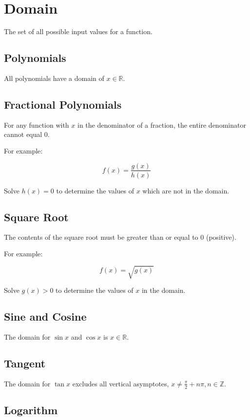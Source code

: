 \documentclass[a4paper,11pt]{article}
\begin{document}
\section{Domain}

The set of all possible input values for a function.


\subsection{Polynomials}

All polynomials have a domain of $x \in \mathbb{R}$.


\subsection{Fractional Polynomials}

For any function with $x$ in the denominator of a fraction, the entire
denominator cannot equal 0.

For example:

$$
f(x) = \frac{g(x)}{h(x)}
$$

Solve $h(x) = 0$ to determine the values of $x$ which are not in the domain.


\subsection{Square Root}

The contents of the square root must be greater than or equal to 0 (positive).

For example:

$$
f(x) = \sqrt{g(x)}
$$

Solve $g(x) > 0$ to determine the values of $x$ in the domain.


\subsection{Sine and Cosine}

The domain for $\sin{x}$ and $\cos{x}$ is $x \in \mathbb{R}$.


\subsection{Tangent}

The domain for $\tan{x}$ excludes all vertical asymptotes,
$x \neq \frac{\pi}{2} + n\pi, n \in \mathbb{Z}$.


\subsection{Logarithm}
\end{document}
